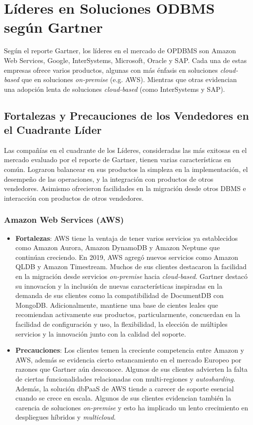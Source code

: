 \documentclass[11pt,letterpaper]{article}
\begin{document}
\section{Líderes en Soluciones ODBMS según Gartner}
Según el reporte Gartner, los líderes en el mercado de OPDBMS son Amazon Web Services, Google, InterSystems, Microsoft, Oracle y SAP. Cada una de estas empresas ofrece varios productos, algunas con más énfasis en soluciones {\em cloud-based} que en soluciones {\em on-premise} (e.g. AWS). Mientras que otras evidencian una adopción lenta de soluciones {\em cloud-based} (como InterSystems y SAP).

	\subsection{Fortalezas y Precauciones de los Vendedores en el Cuadrante Líder}
	Las compañías en el cuadrante de los Líderes, consideradas las más exitosas en el mercado evaluado por el reporte de Gartner, tienen varias características en común. Lograron balancear en sus productos la simpleza en la implementación, el desempeño de las operaciones, y la integración con productos de otros vendedores. Asimismo ofrecieron facilidades en la migración desde otros DBMS \cite{Gartner2019} e interacción con productos de otros vendedores.
		\subsubsection{Amazon Web Services (AWS)}
		\begin{itemize}
		\item {\bf Fortalezas}:
		AWS tiene la ventaja de tener varios servicios ya establecidos como Amazon Aurora, Amazon DynamoDB y Amazon Neptune que continúan creciendo. En 2019, AWS agregó nuevos servicios como Amazon QLDB y Amazon Timestream. Muchos de sus clientes destacaron la facilidad en la migración desde servicios {\em on-premise} hacia {\em cloud-based}. Gartner destacó su innovacíon y la inclusión de nuevas características inspiradas en la demanda de sus clientes como la compatibilidad de DocumentDB con MongoDB. Adicionalmente, mantiene una base de cientes leales que recomiendan activamente sus productos, particularmente, concuerdan en la facilidad de configuración y uso, la flexibilidad, la elección de múltiples servicios y la innovación junto con la calidad del soporte.
		\item {\bf Precauciones}: Los clientes temen la creciente competencia entre Amazon y AWS, además se evidencia cierto estancamiento en el mercado Europeo por razones que Gartner aún desconoce. Algunos de sus clientes advierten la falta de ciertas funcionalidades relacionadas con multi-regiones y {\em autosharding}. Además, la solución dbPaaS de AWS tiende a carecer de soporte esencial cuando se crece en escala. Algunos de sus clientes evidencian también la carencia de soluciones {\em on-premise} y esto ha implicado un lento crecimiento en despliegues híbridos y {\em multicloud}.
		\end{itemize}
\end{document}
